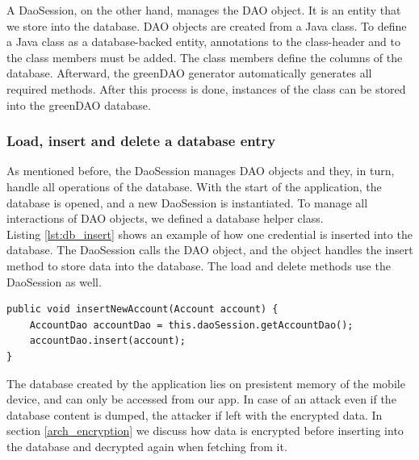 A DaoSession, on the other hand, manages the DAO object. It is an entity that we store into the database. DAO objects are created from a Java class. To define a Java class as a database-backed entity, annotations to the class-header and to the class members must be added. The class members define the columns of the database. Afterward, the greenDAO generator automatically generates all required methods. After this process is done, instances of the class can be stored into the greenDAO database. \cite{Greendao}

\subsubsection*{Load, insert and delete a database entry}
As mentioned before, the DaoSession manages DAO objects and they, in turn, handle all operations of the database. With the start of the application, the database is opened, and a new DaoSession is instantiated. To manage all interactions of DAO objects, we defined a database helper class. \\
Listing \ref{lst:db_insert} shows an example of how one credential is inserted into the database. The DaoSession calls the DAO object, and the object handles the insert method to store data into the database. The load and delete methods use the DaoSession as well. 

\begin{lstlisting}[caption= Insert entry into database, label=lst:db_insert]
public void insertNewAccount(Account account) {
    AccountDao accountDao = this.daoSession.getAccountDao();
    accountDao.insert(account);
}
\end{lstlisting}
\vspace{0.5cm}

The database created by the application lies on presistent memory of the mobile device, and can only be accessed from our app. In case of an attack even if the database content is dumped, the attacker if left with the encrypted data. In section \ref{arch_encryption} we discuss how data is encrypted before inserting into the database and decrypted again when fetching from it. \\


